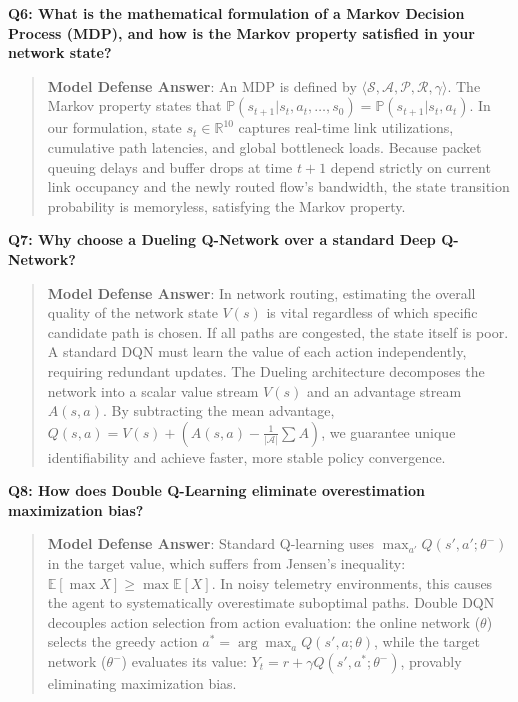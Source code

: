 \documentclass[12pt,a4paper,oneside]{report}
\begin{document}
\noindent\textbf{Q6: What is the mathematical formulation of a Markov Decision Process (MDP), and how is the Markov property satisfied in your network state?}
\begin{quote}
\small
\textbf{Model Defense Answer}: An MDP is defined by $\langle \mathcal{S}, \mathcal{A}, \mathcal{P}, \mathcal{R}, \gamma \rangle$. The Markov property states that $\mathbb{P}(s_{t+1}|s_t, a_t, \dots, s_0) = \mathbb{P}(s_{t+1}|s_t, a_t)$. In our formulation, state $s_t \in \mathbb{R}^{10}$ captures real-time link utilizations, cumulative path latencies, and global bottleneck loads. Because packet queuing delays and buffer drops at time $t+1$ depend strictly on current link occupancy and the newly routed flow's bandwidth, the state transition probability is memoryless, satisfying the Markov property.
\end{quote}

\noindent\textbf{Q7: Why choose a Dueling Q-Network over a standard Deep Q-Network?}
\begin{quote}
\small
\textbf{Model Defense Answer}: In network routing, estimating the overall quality of the network state $V(s)$ is vital regardless of which specific candidate path is chosen. If all paths are congested, the state itself is poor. A standard DQN must learn the value of each action independently, requiring redundant updates. The Dueling architecture decomposes the network into a scalar value stream $V(s)$ and an advantage stream $A(s, a)$. By subtracting the mean advantage, $Q(s, a) = V(s) + (A(s, a) - \frac{1}{|\mathcal{A}|}\sum A)$, we guarantee unique identifiability and achieve faster, more stable policy convergence.
\end{quote}

\noindent\textbf{Q8: How does Double Q-Learning eliminate overestimation maximization bias?}
\begin{quote}
\small
\textbf{Model Defense Answer}: Standard Q-learning uses $\max_{a'} Q(s', a'; \theta^-)$ in the target value, which suffers from Jensen's inequality: $\mathbb{E}[\max X] \ge \max \mathbb{E}[X]$. In noisy telemetry environments, this causes the agent to systematically overestimate suboptimal paths. Double DQN decouples action selection from action evaluation: the online network ($\theta$) selects the greedy action $a^* = \arg\max_a Q(s', a; \theta)$, while the target network ($\theta^-$) evaluates its value: $Y_t = r + \gamma Q(s', a^*; \theta^-)$, provably eliminating maximization bias.
\end{quote}
\end{document}
